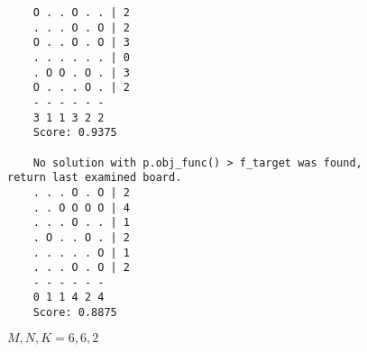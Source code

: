\begin{figure}[h!]
    \begin{verbatim}
    O . . O . . | 2
    . . . O . O | 2
    O . . O . O | 3
    . . . . . . | 0
    . O O . O . | 3
    O . . . O . | 2
    - - - - - -
    3 1 1 3 2 2
    Score: 0.9375

    No solution with p.obj_func() > f_target was found, return last examined board.
    . . . O . O | 2
    . . O O O O | 4
    . . . O . . | 1
    . O . . O . | 2
    . . . . . O | 1
    . . . O . O | 2
    - - - - - -
    0 1 1 4 2 4
    Score: 0.8875
    \end{verbatim}
\caption{$M, N, K = 6, 6, 2$}
\end{figure}
